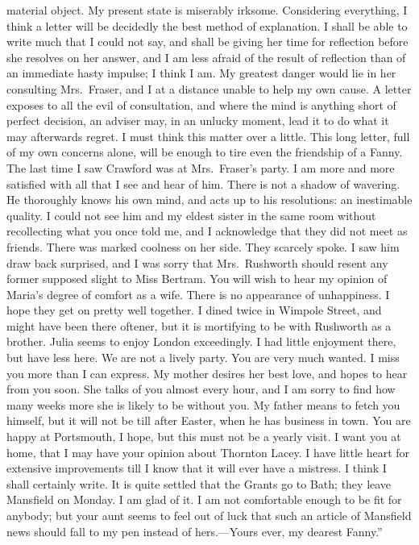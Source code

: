 \documentclass{article}
\begin{document}
material object.  My present state is miserably irksome.
Considering everything, I think a letter will be decidedly
the best method of explanation.  I shall be able to write
much that I could not say, and shall be giving her time
for reflection before she resolves on her answer,
and I am less afraid of the result of reflection
than of an immediate hasty impulse; I think I am.
My greatest danger would lie in her consulting Mrs.\ Fraser,
and I at a distance unable to help my own cause.
A letter exposes to all the evil of consultation,
and where the mind is anything short of perfect decision,
an adviser may, in an unlucky moment, lead it to do what it
may afterwards regret.  I must think this matter over
a little.  This long letter, full of my own concerns alone,
will be enough to tire even the friendship of a Fanny.
The last time I saw Crawford was at Mrs.\ Fraser's party.
I am more and more satisfied with all that I see and hear
of him.  There is not a shadow of wavering.  He thoroughly
knows his own mind, and acts up to his resolutions:
an inestimable quality.  I could not see him and my eldest
sister in the same room without recollecting what you
once told me, and I acknowledge that they did not meet
as friends.  There was marked coolness on her side.
They scarcely spoke.  I saw him draw back surprised,
and I was sorry that Mrs.\ Rushworth should resent any
former supposed slight to Miss Bertram.  You will wish
to hear my opinion of Maria's degree of comfort as a wife.
There is no appearance of unhappiness.  I hope they get
on pretty well together.  I dined twice in Wimpole Street,
and might have been there oftener, but it is mortifying
to be with Rushworth as a brother.  Julia seems to enjoy
London exceedingly.  I had little enjoyment there,
but have less here.  We are not a lively party.  You are
very much wanted.  I miss you more than I can express.
My mother desires her best love, and hopes to hear
from you soon.  She talks of you almost every hour,
and I am sorry to find how many weeks more she is likely
to be without you.  My father means to fetch you himself,
but it will not be till after Easter, when he has
business in town.  You are happy at Portsmouth, I hope,
but this must not be a yearly visit.  I want you at home,
that I may have your opinion about Thornton Lacey.
I have little heart for extensive improvements till
I know that it will ever have a mistress.  I think I
shall certainly write.  It is quite settled that the
Grants go to Bath; they leave Mansfield on Monday.
I am glad of it.  I am not comfortable enough to be fit
for anybody; but your aunt seems to feel out of luck
that such an article of Mansfield news should fall
to my pen instead of hers.---Yours ever, my dearest
Fanny.''
\end{document}
